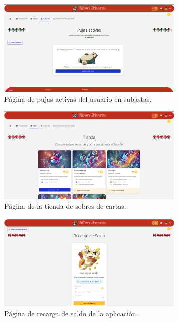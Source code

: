 \begin{figure}[H]
    \centering
    \includegraphics[width=0.8\textwidth]{figures/6-Analisis/6-Interfaz/interfaz/pujas.png}
    \caption{Página de pujas activas del usuario en subastas.}
    \label{fig:interfaz-gimnasios}
\end{figure}


\begin{figure}[H]
    \centering
    \includegraphics[width=0.8\textwidth]{figures/6-Analisis/6-Interfaz/interfaz/tienda.png}
    \caption{Página de la tienda de sobres de cartas.}
    \label{fig:interfaz-tienda}
\end{figure}


\begin{figure}[H]
    \centering
    \includegraphics[width=0.8\textwidth]{figures/6-Analisis/6-Interfaz/interfaz/recarga.png}
    \caption{Página de recarga de saldo de la aplicación.}
    \label{fig:interfaz-recarga}
\end{figure}


